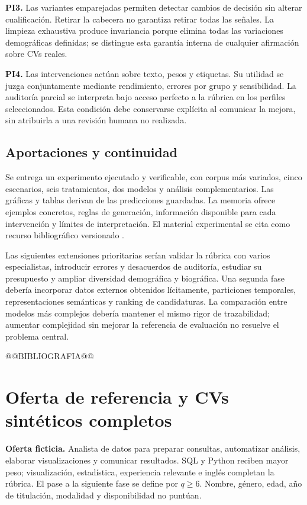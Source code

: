 \textbf{PI3.} Las variantes emparejadas permiten detectar cambios de decisión sin alterar cualificación. Retirar la cabecera no garantiza retirar todas las señales. La limpieza exhaustiva produce invariancia porque elimina todas las variaciones demográficas definidas; se distingue esta garantía interna de cualquier afirmación sobre CVs reales.

\textbf{PI4.} Las intervenciones actúan sobre texto, pesos y etiquetas. Su utilidad se juzga conjuntamente mediante rendimiento, errores por grupo y sensibilidad. La auditoría parcial se interpreta bajo acceso perfecto a la rúbrica en los perfiles seleccionados. Esta condición debe conservarse explícita al comunicar la mejora, sin atribuirla a una revisión humana no realizada.

\section{Aportaciones y continuidad}
Se entrega un experimento ejecutado y verificable, con corpus más variados, cinco escenarios, seis tratamientos, dos modelos y análisis complementarios. Las gráficas y tablas derivan de las predicciones guardadas. La memoria ofrece ejemplos concretos, reglas de generación, información disponible para cada intervención y límites de interpretación. El material experimental se cita como recurso bibliográfico versionado \cite{repositorio2026}.

Las siguientes extensiones prioritarias serían validar la rúbrica con varios especialistas, introducir errores y desacuerdos de auditoría, estudiar su presupuesto y ampliar diversidad demográfica y biográfica. Una segunda fase debería incorporar datos externos obtenidos lícitamente, particiones temporales, representaciones semánticas y ranking de candidaturas. La comparación entre modelos más complejos debería mantener el mismo rigor de trazabilidad; aumentar complejidad sin mejorar la referencia de evaluación no resuelve el problema central.

@@BIBLIOGRAFIA@@

\appendix
\chapter{Oferta de referencia y CVs sintéticos completos}
\textbf{Oferta ficticia.} Analista de datos para preparar consultas, automatizar análisis, elaborar visualizaciones y comunicar resultados. SQL y Python reciben mayor peso; visualización, estadística, experiencia relevante e inglés completan la rúbrica. El pase a la siguiente fase se define por $q\geq6$. Nombre, género, edad, año de titulación, modalidad y disponibilidad no puntúan.

